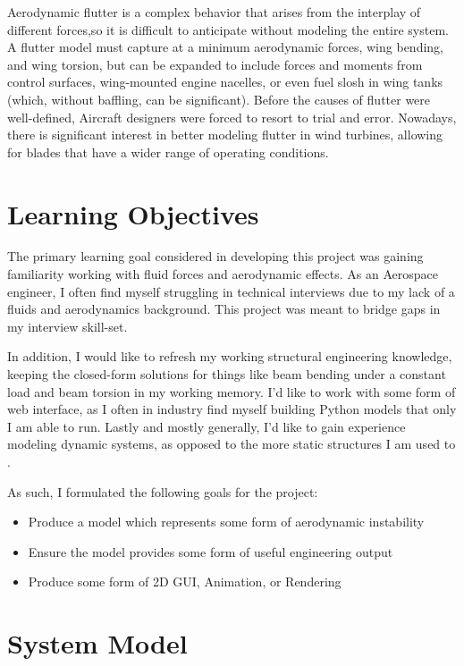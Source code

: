 \documentclass[]{article}
\begin{document}
Aerodynamic flutter is a complex behavior that arises from the interplay of different forces,so it is difficult to anticipate without modeling the entire system. A flutter model must capture at a minimum aerodynamic forces, wing bending, and wing torsion, but can be expanded to include forces and moments from control surfaces, wing-mounted engine nacelles, or even fuel slosh in wing tanks (which, without baffling, can be significant). Before the causes of flutter were well-defined, Aircraft designers were forced to resort to trial and error. Nowadays, there is significant interest in better modeling flutter in wind turbines, allowing for blades that have a wider range of operating conditions. 

\section{Learning Objectives}

The primary learning goal considered in developing this project was gaining familiarity working with fluid forces and aerodynamic effects. As an Aerospace engineer, I often find myself struggling in technical interviews due to my lack of a fluids and aerodynamics background. This project was meant to bridge gaps in my interview skill-set.

In addition, I would like to refresh my working structural engineering knowledge, keeping the closed-form solutions for things like beam bending under a constant load and beam torsion in my working memory. I'd like to work with some form of web interface, as I often in industry find myself building Python models that only I am able to run. Lastly and mostly generally, I'd like to gain experience modeling dynamic systems, as opposed to the more static structures I am used to .

As such, I formulated the following goals for the project:

\begin{itemize}
	\item Produce a model which represents some form of aerodynamic instability
	\item Ensure the model provides some form of useful engineering output
	\item Produce some form of 2D GUI, Animation, or Rendering 
\end{itemize}

\section{System Model}
\end{document}
